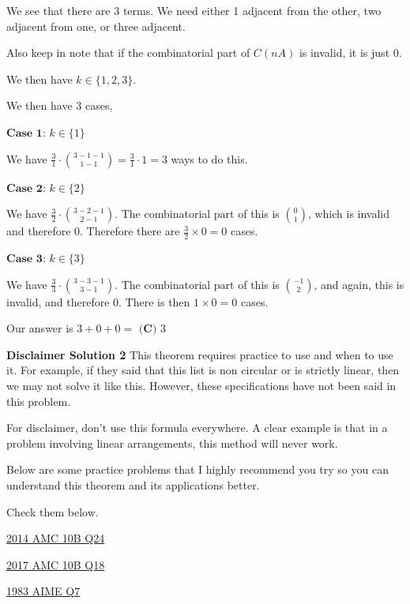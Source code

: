\begin{enumerate}
 We see that there are 3 terms. We need either 1 adjacent from the other, two adjacent from one, or three adjacent.

 Also keep in note that if the combinatorial part of \( C(nA) \) is invalid, it is just 0.

 We then have \( k \in \{1, 2, 3\} \).

 We then have 3 cases,

 $\textbf{Case 1:}$ $k \in \{1\}$

 We have \(  \frac{3}{1} \cdot \binom{3-1-1}{1-1} = \frac{3}{1} \cdot 1 = 3 \) ways to do this.

 $\textbf{Case 2:}$ $k \in \{2\}$

 We have \( \frac{3}{2} \cdot \binom{3-2-1}{2-1} \). The combinatorial part of this is \( \binom{0}{1} \), which is invalid and therefore 0. Therefore there are \( \frac{3}{2} \times 0 = 0 \) cases.

 $\textbf{Case 3:}$ $k \in \{3\}$

 We have \( \frac{3}{3} \cdot \binom{3-3-1}{3-1} \). The combinatorial part of this is \( \binom{-1}{2} \), and again, this is invalid, and therefore 0. There is then \( 1 \times 0 = 0 \) cases.

 Our answer is \( 3 + 0 + 0 =  \) $\boxed{\textbf{(C) }3}$

 \textbf{Disclaimer Solution 2} This theorem requires practice to use and when to use it. For example, if they said that this list is non circular or is strictly linear, then we may not solve it like this. However, these specifications have not been said in this problem.

 For disclaimer, don't use this formula everywhere. A clear example is that in a problem involving linear arrangements, this method will never work.

 Below are some practice problems that I highly recommend you try so you can understand this theorem and its applications better.

 Check them below.

 \href{https://artofproblemsolving.com/wiki/index.php/2014\_AMC\_10B\_Problems/Problem\_24}{2014 AMC 10B Q24}

 \href{https://artofproblemsolving.com/wiki/index.php/2017\_AMC\_10B\_Problems/Problem\_18?srsltid=AfmBOoorbWvdWI5mJYkf\_XsGNK8N7JEX7G2S4w13Uy\_lkqkFIXMbqJQc}{2017 AMC 10B Q18}

 \href{https://artofproblemsolving.com/wiki/index.php/1983\_AIME\_Problems/Problem\_7?srsltid=AfmBOoo2Rma8yq6kbV0holdmtaa2Zr2ezKPOD6cPyGa0Xs8GcMtwEf3J}{1983 AIME Q7}


\end{enumerate}

